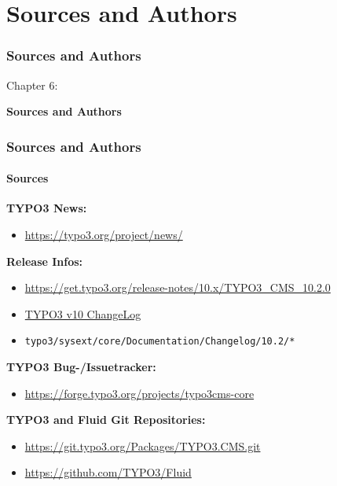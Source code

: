 %

\section{Sources and Authors}
\begin{frame}[fragile]
	\frametitle{Sources and Authors}

	\begin{center}\huge{Chapter 6:}\end{center}
	\begin{center}\huge{\color{typo3darkgrey}\textbf{Sources and Authors}}\end{center}

\end{frame}


\begin{frame}[fragile]
	\frametitle{Sources and Authors}
	\framesubtitle{Sources}

	\textbf{TYPO3 News:}
		\begin{itemize}\smaller
			\item \url{https://typo3.org/project/news/}
		\end{itemize}

	\textbf{Release Infos:}
		\begin{itemize}\smaller
			\item \url{https://get.typo3.org/release-notes/10.x/TYPO3_CMS_10.2.0}
			\item \href{https://docs.typo3.org/c/typo3/cms-core/master/en-us/Changelog-10.html}{TYPO3 v10 ChangeLog}
			\item \texttt{typo3/sysext/core/Documentation/Changelog/10.2/*}
		\end{itemize}

	\textbf{TYPO3 Bug-/Issuetracker:}
		\begin{itemize}\smaller
			\item \url{https://forge.typo3.org/projects/typo3cms-core}
		\end{itemize}

	\textbf{TYPO3 and Fluid Git Repositories:}
		\begin{itemize}\smaller
			\item \url{https://git.typo3.org/Packages/TYPO3.CMS.git}
			\item \url{https://github.com/TYPO3/Fluid}
		\end{itemize}

\end{frame}

